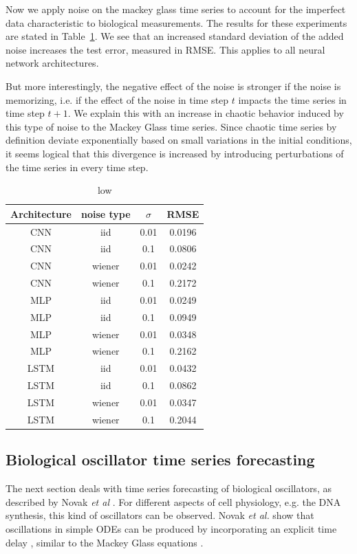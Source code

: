 \documentclass{article}
\begin{document}
Now we apply noise on the mackey glass time series to account for the imperfect
data characteristic to biological measurements. The results for these 
experiments are stated in Table~\ref{tab:mackey_noise}. We see that an increased
standard deviation of the added noise increases the test error, measured in 
RMSE. This applies to all neural network architectures. 

But more interestingly,
the negative effect of the noise is stronger if the noise is memorizing, i.e. if
the effect of the noise in time step $t$ impacts the time series in time step 
$t + 1$. We explain this with an increase in chaotic behavior induced by this
type of noise to the Mackey Glass time series. Since chaotic time series by 
definition deviate exponentially based on small variations in the initial
conditions, it seems logical that this divergence is increased by introducing
perturbations of the time series in every time step.

\begin{table} 
  \centering  
  \begin{tabular}{c|c|c|c}
    Architecture & noise type & $\sigma$ & RMSE \\
    \hline
    CNN & iid & 0.01 & 0.0196 \\
    CNN & iid & 0.1 & 0.0806 \\ 
    CNN & wiener & 0.01 & 0.0242 \\
    CNN & wiener & 0.1 & 0.2172 \\
    MLP & iid & 0.01 & 0.0249 \\
    MLP & iid & 0.1 & 0.0949 \\
    MLP & wiener & 0.01 & 0.0348 \\
    MLP & wiener & 0.1 & 0.2162 \\
    LSTM & iid & 0.01 & 0.0432 \\
    LSTM & iid & 0.1 & 0.0862 \\
    LSTM & wiener & 0.01 & 0.0347 \\
    LSTM & wiener & 0.1 & 0.2044 \\
  \end{tabular}
  \caption{low}
  \label{tab:mackey_noise}
\end{table}

\subsection{Biological oscillator time series forecasting}

The next section deals with time series forecasting of biological oscillators,
as described by Novak \textit{et al} \cite{novak2008}. For different aspects of
cell physiology, e.g. the DNA synthesis, this kind of oscillators can be
observed. Novak \textit{et al.} show that oscillations in simple ODEs can be
produced by incorporating an explicit time delay \cite{novak2008}, similar to
the Mackey Glass equations \cite{mackey1977}.
\end{document}
